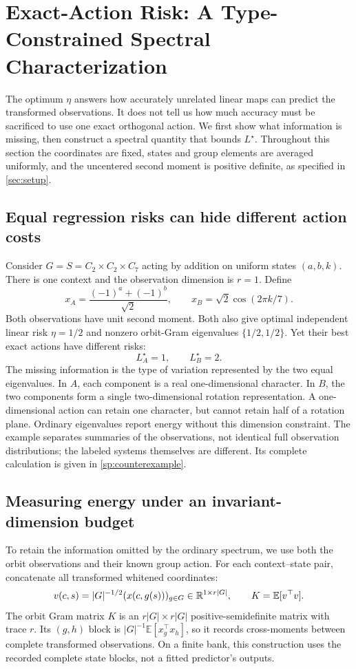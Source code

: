 \section{Exact-Action Risk: A Type-Constrained Spectral Characterization}
\label{sec:boundaries}
The optimum $\eta$ answers how accurately unrelated linear maps can predict the transformed observations. It does not tell us how much accuracy must be sacrificed to use one exact orthogonal action. We first show what information is missing, then construct a spectral quantity that bounds $L^\star$. Throughout this section the coordinates are fixed, states and group elements are averaged uniformly, and the uncentered second moment is positive definite, as specified in \cref{sec:setup}.

\subsection{Equal regression risks can hide different action costs}
Consider $G=S=C_2\times C_2\times C_7$ acting by addition on uniform states $(a,b,k)$. There is one context and the observation dimension is $r=1$. Define
\[
 x_A=\frac{(-1)^a+(-1)^b}{\sqrt2},\qquad
 x_B=\sqrt2\cos(2\pi k/7).
\]
Both observations have unit second moment. Both also give optimal independent linear risk $\eta=1/2$ and nonzero orbit-Gram eigenvalues $\{1/2,1/2\}$. Yet their best exact actions have different risks:
\[
 \boxed{L_A^\star=1,\qquad L_B^\star=2.}
\]
The missing information is the type of variation represented by the two equal eigenvalues. In $A$, each component is a real one-dimensional character. In $B$, the two components form a single two-dimensional rotation representation. A one-dimensional action can retain one character, but cannot retain half of a rotation plane. Ordinary eigenvalues report energy without this dimension constraint. The example separates summaries of the observations, not identical full observation distributions; the labeled systems themselves are different. Its complete calculation is given in \cref{sp:counterexample}.

\subsection{Measuring energy under an invariant-dimension budget}
To retain the information omitted by the ordinary spectrum, we use both the orbit observations and their known group action. For each context--state pair, concatenate all transformed whitened coordinates:
\begin{equation}
 v(c,s)=|G|^{-1/2}(x(c,g(s)))_{g\in G}\in\mathbb{R}^{1\times r|G|},
 \qquad K=\mathbb E[v^\top v].
 \label{eq:orbit-gram-main}
\end{equation}
The orbit Gram matrix $K$ is an $r|G|\times r|G|$ positive-semidefinite matrix with trace $r$. Its $(g,h)$ block is $|G|^{-1}\mathbb E[x_g^\top x_h]$, so it records cross-moments between complete transformed observations. On a finite bank, this construction uses the recorded complete state blocks, not a fitted predictor's outputs.

